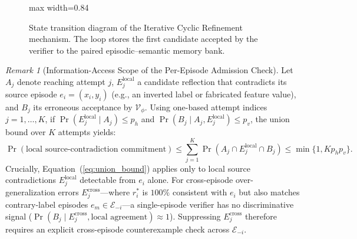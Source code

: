 \documentclass[10pt,a4paper,onecolumn]{article}
\theoremstyle{definition}
\theoremstyle{remark}
\newtheorem{remark}{Remark}
\begin{document}
\begin{figure}[!t]
\centering
\begin{adjustbox}{max width=0.84\linewidth}\end{adjustbox}
\caption{State transition diagram of the Iterative Cyclic Refinement mechanism. The loop stores the first candidate accepted by the verifier to the paired episodic--semantic memory bank.}
\label{fig:cyclic_refinement}
\end{figure}

\begin{remark}[Information-Access Scope of the Per-Episode Admission Check]
Let $A_j$ denote reaching attempt $j$, $E_j^{\mathrm{local}}$ a candidate reflection that contradicts its source episode $e_i=(x_i,y_i)$ (e.g., an inverted label or fabricated feature value), and $B_j$ its erroneous acceptance by $\mathcal{V}_\phi$. Using one-based attempt indices $j=1,\ldots,K$, if $\Pr(E_j^{\mathrm{local}}\mid A_j)\leq p_h$ and $\Pr(B_j\mid A_j,E_j^{\mathrm{local}})\leq p_v$, the union bound over $K$ attempts yields:
\begin{equation}
    \Pr(\text{local source-contradiction commitment}) \leq \sum_{j=1}^{K}\Pr(A_j\cap E_j^{\mathrm{local}}\cap B_j) \leq \min\{1,Kp_hp_v\}.
    \label{eq:union_bound}
\end{equation}
Crucially, Equation~(\ref{eq:union_bound}) applies only to local source contradictions $E_j^{\mathrm{local}}$ detectable from $e_i$ alone. For cross-episode over-generalization errors $E_j^{\mathrm{cross}}$---where $r_i^*$ is $100\%$ consistent with $e_i$ but also matches contrary-label episodes $e_m \in \mathcal{E}_{-i}$---a single-episode verifier has no discriminative signal ($\Pr(B_j \mid E_j^{\mathrm{cross}}, \text{local agreement}) \approx 1$). Suppressing $E_j^{\mathrm{cross}}$ therefore requires an explicit cross-episode counterexample check across $\mathcal{E}_{-i}$.
\end{remark}
\end{document}
